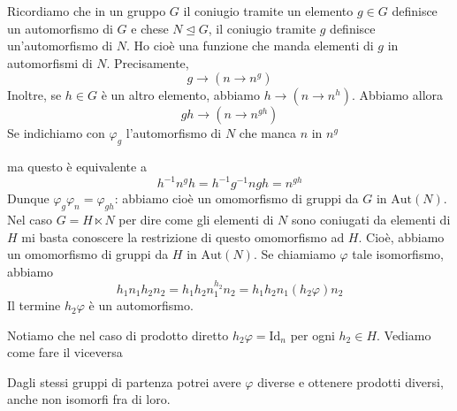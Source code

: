 \documentclass[a4paper]{article}
\begin{document}
Ricordiamo che in un gruppo \(G\) il coniugio
tramite un elemento \(g\in G\) definisce un automorfismo
di \(G\) e chese \(N \unlhd G\), il coniugio tramite \(g\)
definisce un'automorfismo di \(N\).
Ho cioè una funzione che manda elementi di \(g\)
in automorfismi di \(N\).
Precisamente,
\[
    g\to (n \to n^g)
\]
Inoltre, se \(h\in G\) è un altro elemento, abbiamo
\(h \to (n \to n^h)\).
Abbiamo allora
\[
    gh \to (n \to n^{gh})
\]
Se indichiamo con \(\varphi_g\) l'automorfismo
di \(N\) che manca \(n\) in \(n^g\)

\begin{center}
\end{center}
ma questo è equivalente a
\[
    h^{-1} n^g h = h^{-1} g^{-1} ngh = n^{gh}
\]
Dunque \(\varphi_g \varphi_n = \varphi_{gh}\):
abbiamo cioè un omomorfismo di gruppi da \(G\) in \(\text{Aut}(N)\).
Nel caso \(G = H \ltimes N\)
per dire come gli elementi di \(N\) sono coniugati da elementi di \(H\)
mi basta conoscere la restrizione di questo omomorfismo ad \(H\).
Cioè, abbiamo un omomorfismo di gruppi da \(H\) in \(\text{Aut}(N)\).
Se chiamiamo \(\varphi\) tale isomorfismo, abbiamo
\[
    h_1n_1h_2n_2 = h_1h_2n_1^{h_2} n_2 = h_1h_2 n_1 (h_2 \varphi)n_2
\]
Il termine \(h_2\varphi\) è un automorfismo.

Notiamo che nel caso di prodotto diretto
\(h_2 \varphi = \text{Id}_n\) per ogni \(h_2 \in H\).
Vediamo come fare il viceversa


Dagli stessi gruppi di partenza potrei avere \(\varphi\) diverse e ottenere
prodotti diversi, anche non isomorfi fra di loro.
\end{document}
